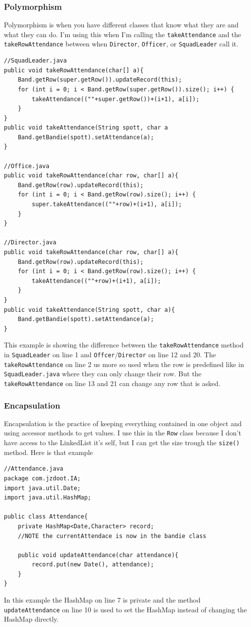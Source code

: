 \documentclass{article}
\begin{document}
\subsubsection{Polymorphism}
Polymorphism is when you have different classes that know what they are and what they can do. I'm using this when I'm calling the \verb|takeAttendance| and the \verb|takeRowAttendance| between when \verb|Director|, \verb|Officer|, or \verb|SquadLeader| call it.
\begin{lstlisting}
//SquadLeader.java
public void takeRowAttendance(char[] a){
	Band.getRow(super.getRow()).updateRecord(this);
	for (int i = 0; i < Band.getRow(super.getRow()).size(); i++) {
		takeAttendance((""+super.getRow())+(i+1), a[i]);
	}
}
public void takeAttendance(String spott, char a
	Band.getBandie(spott).setAttendance(a);
}

//Office.java
public void takeRowAttendance(char row, char[] a){
	Band.getRow(row).updateRecord(this);
	for (int i = 0; i < Band.getRow(row).size(); i++) {
		super.takeAttendance((""+row)+(i+1), a[i]);
	}
}

//Director.java
public void takeRowAttendance(char row, char[] a){
	Band.getRow(row).updateRecord(this);
	for (int i = 0; i < Band.getRow(row).size(); i++) {
		takeAttendance((""+row)+(i+1), a[i]);
	}
}
public void takeAttendance(String spott, char a){
	Band.getBandie(spott).setAttendance(a);
}
\end{lstlisting}
This example is showing the difference between the \verb|takeRowAttendance| method in \verb|SquadLeader| on line 1 and \verb|Offcer|/\verb|Director| on line 12 and 20. The \verb|takeRowAttendance| on line 2 us more so used when the row is predefined like in \verb|SquadLeader.java| where they can only change their row. But the \verb|takeRowAttendance| on line 13 and 21 can change any row that is asked.
\subsubsection{Encapsulation}
Encapsulation is the practice of keeping everything contained in one object and using accessor methods to get values. I use this in the \verb|Row| class because I don't have access to the LinkedList\cite{linkedList} it's self, but I can get the size trough the \verb|size()| method. Here is that example
\begin{lstlisting}
//Attendance.java
package com.jzdoot.IA;
import java.util.Date;
import java.util.HashMap;

public class Attendance{
	private HashMap<Date,Character> record;
	//NOTE the currentAttendace is now in the bandie class

	public void updateAttendance(char attendance){
		record.put(new Date(), attendance);
	}
}
\end{lstlisting}
In this example the HashMap\cite{hashMap} on line 7 is private and the method \verb|updateAttendance| on line 10 is used to set the HashMap instead of changing the HashMap directly.
\end{document}
